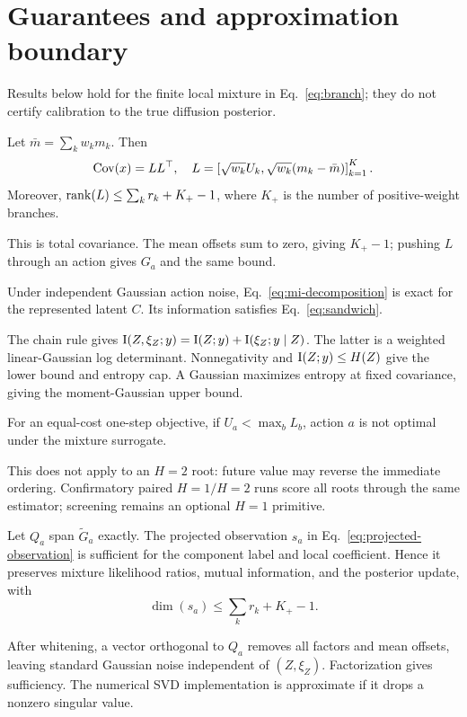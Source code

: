 \section{Guarantees and approximation boundary}
\label{sec:theory}

Results below hold for the finite local mixture in Eq.~\eqref{eq:branch};
they do not certify calibration to the true diffusion posterior.

\begin{proposition}
Let $\bar m=\sum_kw_km_k$.  Then
\begin{equation}
 \operatorname{Cov}(x)=LL^\top,\quad
 L=\left[\sqrt{w_k}U_k,\sqrt{w_k}(m_k-\bar m)\right]_{k=1}^K.
\end{equation}
Moreover, $\operatorname{rank}(L)\leq\sum_kr_k+K_+-1$, where $K_+$ is the number of
positive-weight branches.
\end{proposition}
\noindent
This is total covariance.  The mean offsets sum to zero, giving $K_+-1$;
pushing $L$ through an action gives $G_a$ and the same bound.

\begin{theorem}
Under independent Gaussian action noise, Eq.~\eqref{eq:mi-decomposition} is
exact for the represented latent $C$.  Its information satisfies
Eq.~\eqref{eq:sandwich}.
\end{theorem}
\noindent
The chain rule gives
$\mathrm{I}(Z,\xi_Z;y)=\mathrm{I}(Z;y)+\mathrm{I}(\xi_Z;y\mid Z)$.  The latter is a weighted
linear-Gaussian log determinant.  Nonnegativity and
$\mathrm{I}(Z;y)\leq H(Z)$ give the lower bound and entropy cap.  A Gaussian maximizes
entropy at fixed covariance, giving the moment-Gaussian upper bound.

\begin{corollary}
For an equal-cost one-step objective, if $U_a<\max_bL_b$, action $a$ is not
optimal under the mixture surrogate.
\end{corollary}
\noindent
This does not apply to an $H=2$ root: future value may reverse the immediate
ordering.  Confirmatory paired $H=1/H=2$ runs score all roots through the same
estimator; screening remains an optional $H=1$ primitive.

\begin{theorem}
Let $Q_a$ span $\widetilde G_a$ exactly.  The projected observation $s_a$ in
Eq.~\eqref{eq:projected-observation} is sufficient for the component label and
local coefficient.  Hence it preserves mixture likelihood ratios, mutual
information, and the posterior update, with
\begin{equation}
 \dim(s_a)\leq\sum_kr_k+K_+-1.
\end{equation}
\end{theorem}
\noindent
After whitening, a vector orthogonal to $Q_a$ removes all factors and mean
offsets, leaving standard Gaussian noise independent of $(Z,\xi_Z)$.
Factorization gives sufficiency.  The numerical SVD implementation is
approximate if it drops a nonzero singular value.

